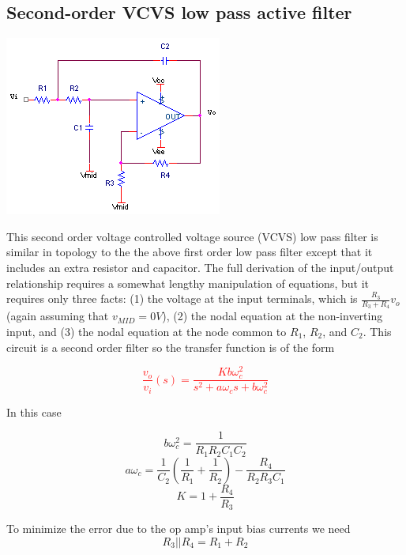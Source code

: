 \subsection{Second-order VCVS low pass active filter}
\begin{center}
	\includegraphics{schematics/2ndorder_vcvs_LPfilter.PNG}
\end{center}
This second order voltage controlled voltage source (VCVS) low pass filter is similar in topology to the the above first order low pass filter except that it includes an extra resistor and capacitor. The full derivation of the input/output relationship requires a somewhat lengthy manipulation of equations, but it requires only three facts: (1) the voltage at the input terminals, which is $\frac{R_{3}}{R_{3}+R_{4}}v_{o}$ (again assuming that $v_{MID} = 0V$), (2) the nodal equation at the non-inverting input, and (3) the nodal equation at the node common to $R_{1}$, $R_{2}$, and $C_{2}$. This circuit is a second order filter so the transfer function is of the form

\textcolor{red}{
\begin{equation}
\frac{v_{o}}{v_{i}}(s) = \frac{Kb\omega_{c}^{2}}{s^{2} + a\omega_{c}s + b\omega_{c}^{2}}
\label{eq:2ndorder_vcvs_LPfilter}
\end{equation}
}

In this case

\begin{equation}
b\omega_{c}^{2} = \frac{1}{R_{1}R_{2}C_{1}C_{2}}
\end{equation}
\begin{equation}
a\omega_{c} = \frac{1}{C_{2}}\left(\frac{1}{R_{1}} + \frac{1}{R_{2}}\right) - \frac{R_{4}}{R_{2}R_{3}C_{1}}
\end{equation}
\begin{equation}
K = 1 + \frac{R_{4}}{R_{3}}
\end{equation}

To minimize the error due to the op amp's input bias currents we need \begin{equation}
R_{3}||R_{4} = R_{1} + R_{2}
\end{equation}

